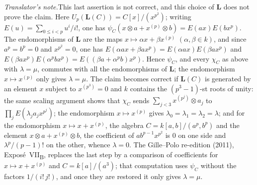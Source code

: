 \noindent\textit{Translator's note.}\enspace This last assertion is not
correct, and this choice of \(\mathbf L\) does not prove the claim. Here
\(U_p(\mathbf L(C))=C[x]/(x^{p^2})\); writing
\(E(u)=\sum_{0\leq i<p}u^i/i!\), one has
\(\psi_C(x\otimes a+x^{(p)}\otimes b)=E(ax)E(bx^p)\). The endomorphisms
of \(\mathbf L\) are the maps \(x\mapsto\alpha x+\beta x^{(p)}\)
\((\alpha,\beta\in k)\), and since \(a^p=b^p=0\) and \(x^{p^2}=0\), one
has \(E(\alpha ax+\beta ax^p)=E(\alpha ax)E(\beta ax^p)\) and
\(E(\beta ax^p)E(\alpha^pbx^p)=E((\beta a+\alpha^pb)x^p)\). Hence
\(\psi_C\), and every \(\chi_C\) as above with \(\lambda=\mu\), commutes
with all the endomorphisms of \(\mathbf L\); the endomorphism
\(x\mapsto x^{(p)}\) only gives \(\lambda=\mu\). The claim becomes
correct if \(\mathbf L(C)\) is generated by an element \(x\) subject to
\(x^{(p^3)}=0\) and \(k\) contains the \((p^3-1)\)-st roots of unity:
the same scaling argument shows that \(\chi_C\) sends
\(\sum_{j<3}x^{(p^j)}\otimes a_j\) to \(\prod_jE(\lambda_ja_jx^{p^j})\);
the endomorphism \(x\mapsto x^{(p)}\) gives
\(\lambda_0=\lambda_1=\lambda_2=\lambda\); and for the endomorphism
\(x\mapsto x+x^{(p)}\), the algebra \(C=k[a,b]/(a^p,b^p)\) and the
element \(x\otimes a+x^{(p)}\otimes b\), the coefficient of
\(ab^{p-1}x^{p^2}\) is \(0\) on one side and \(\lambda^p/(p-1)!\) on the
other, whence \(\lambda=0\). The Gille--Polo re-edition (2011),
Expos\'e~VII\textsubscript{B}, replaces the last step by a comparison of
coefficients for \(x\mapsto x+x^{(p)}\) and \(C=k[a]/(a^3)\); that
computation uses \(\psi_C\) without the factors \(1/(i!\,j!)\), and once
they are restored it only gives \(\lambda=\mu\).
